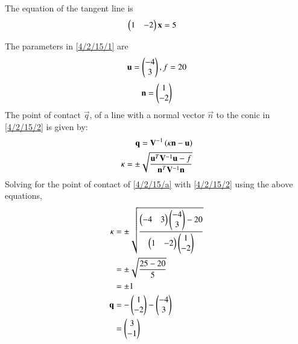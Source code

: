 The equation of the tangent line is
\begin{align}
\begin{pmatrix}1&-2\end{pmatrix}\mathbf{x}&= 5 \label{4/2/15/a}
\end{align}


The parameters in  \eqref{4/2/15/1} are 
\begin{align}
\mathbf{u}=\begin{pmatrix}-4 \\ 3\end{pmatrix}, f=20
\end{align}
\begin{align}
\mathbf{n} = \begin{pmatrix}1 \\ -2\end{pmatrix}
\end{align}
 The point of contact $\vec{q}$, of a line with a normal vector $\vec{n}$ to the conic in \eqref{4/2/15/2} is given by:
\begin{align}
\mathbf{q} = \mathbf{V}^{-1}\left(\kappa \mathbf{n}-\mathbf{u}\right) 
\\
\kappa = \pm \sqrt{\frac{\mathbf{u}^T\mathbf{V}^{-1}\mathbf{u}-f}{\mathbf{n}^T\mathbf{V}^{-1}\mathbf{n}}} 
\end{align}
Solving for the point of contact of \eqref{4/2/15/a} with  \eqref{4/2/15/2} using the above equations,
\begin{align}
\kappa &= \pm \sqrt{\frac{\begin{pmatrix} -4 & 3 \end{pmatrix}\begin{pmatrix}-4 \\ 3\end{pmatrix} - 20}{\begin{pmatrix}1 & -2 \end{pmatrix}\begin{pmatrix}1 \\ -2 \end{pmatrix}}} \\
&= \pm \sqrt{\frac{25 - 20}{5}} \\
& =  \pm{1} \\
\mathbf{q} &= -\begin{pmatrix} 1\\-2 \end{pmatrix} - \begin{pmatrix}-4 \\ 3\end{pmatrix} \\
&= \begin{pmatrix}3 \\ -1\end{pmatrix}
\end{align}
